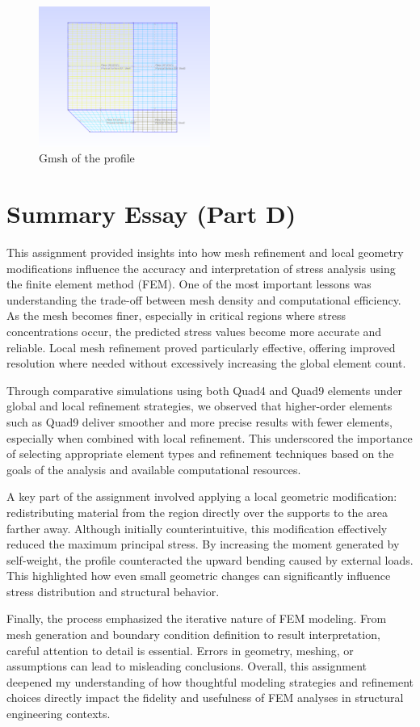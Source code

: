 \documentclass[12pt]{article}
\begin{document}
\begin{figure}[H]
    \centering
    \includegraphics[width=0.5\textwidth]{image.png}
    \caption{Gmsh of the profile}
    \label{fig:modified_profile_stress}
\end{figure}

\newpage
\section{Summary Essay (Part D)}

This assignment provided insights into how mesh refinement and local geometry modifications influence the accuracy and interpretation of stress analysis using the finite element method (FEM). One of the most important lessons was understanding the trade-off between mesh density and computational efficiency. As the mesh becomes finer, especially in critical regions where stress concentrations occur, the predicted stress values become more accurate and reliable. Local mesh refinement proved particularly effective, offering improved resolution where needed without excessively increasing the global element count.

Through comparative simulations using both Quad4 and Quad9 elements under global and local refinement strategies, we observed that higher-order elements such as Quad9 deliver smoother and more precise results with fewer elements, especially when combined with local refinement. This underscored the importance of selecting appropriate element types and refinement techniques based on the goals of the analysis and available computational resources.

A key part of the assignment involved applying a local geometric modification: redistributing material from the region directly over the supports to the area farther away. Although initially counterintuitive, this modification effectively reduced the maximum principal stress. By increasing the moment generated by self-weight, the profile counteracted the upward bending caused by external loads. This highlighted how even small geometric changes can significantly influence stress distribution and structural behavior.

Finally, the process emphasized the iterative nature of FEM modeling. From mesh generation and boundary condition definition to result interpretation, careful attention to detail is essential. Errors in geometry, meshing, or assumptions can lead to misleading conclusions. Overall, this assignment deepened my understanding of how thoughtful modeling strategies and refinement choices directly impact the fidelity and usefulness of FEM analyses in structural engineering contexts.
\end{document}
